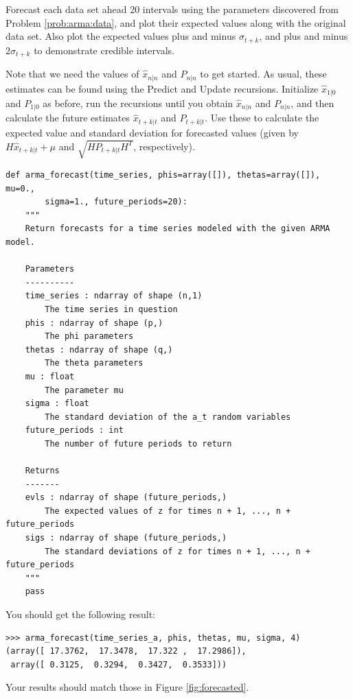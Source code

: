 \begin{problem}
\label{prob:arma:forecast}
Forecast each data set ahead 20 intervals using the parameters discovered from
Problem \ref{prob:arma:data}, and plot their expected values along with the
original data set. Also plot the expected values plus and minus $\sigma_{t+k}$,
and plus and minus $2\sigma_{t+k}$ to demonstrate credible intervals.

Note that we need the values of $\hat{x}_{n|n}$ and $P_{n|n}$ to get started.
As usual, these estimates can be found using the Predict and Update recursions.
Initialize $\hat{x}_{1|0}$ and $P_{1|0}$ as before, run the recursions until you
obtain $\hat{x}_{n|n}$ and $P_{n|n}$, and then calculate the future
estimates $\hat{x}_{t+k|t}$ and $P_{t+k|t}$. Use these to calculate the expected
value and standard deviation for forecasted values (given by $H\hat{x}_{t+k|t} + \mu$
and $\sqrt{HP_{t+k|t}H^T}$, respectively).
\begin{lstlisting}
def arma_forecast(time_series, phis=array([]), thetas=array([]), mu=0.,
        sigma=1., future_periods=20):
    """
    Return forecasts for a time series modeled with the given ARMA model.

    Parameters
    ----------
    time_series : ndarray of shape (n,1)
        The time series in question
    phis : ndarray of shape (p,)
        The phi parameters
    thetas : ndarray of shape (q,)
        The theta parameters
    mu : float
        The parameter mu
    sigma : float
        The standard deviation of the a_t random variables
    future_periods : int
        The number of future periods to return

    Returns
    -------
    evls : ndarray of shape (future_periods,)
        The expected values of z for times n + 1, ..., n + future_periods
    sigs : ndarray of shape (future_periods,)
        The standard deviations of z for times n + 1, ..., n + future_periods
    """
    pass
\end{lstlisting}

\vspace{3mm} \noindent
You should get the following result:
\begin{lstlisting}
>>> arma_forecast(time_series_a, phis, thetas, mu, sigma, 4)
(array([ 17.3762,  17.3478,  17.322 ,  17.2986]),
 array([ 0.3125,  0.3294,  0.3427,  0.3533]))
\end{lstlisting}

\vspace{3mm} \noindent
Your results should match those in Figure \ref{fig:forecasted}.
\end{problem}

